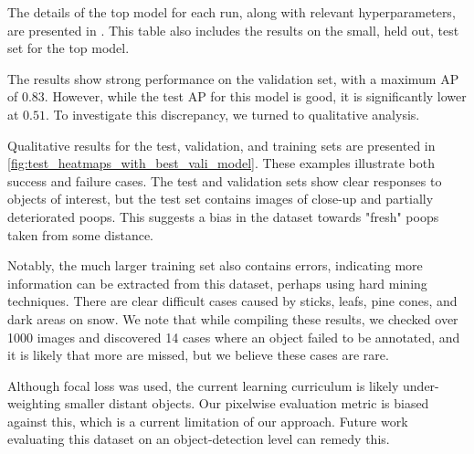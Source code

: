 \documentclass[10pt,twocolumn,letterpaper]{article}
\begin{document}

The details of the top model for each run, along with relevant hyperparameters, are presented in
  .
This table also includes the results on the small, held out, test set for the top model.

The results show strong performance on the validation set, with a maximum AP of $0.83$.
However, while the test AP for this model is good, it is significantly lower at $0.51$.
To investigate this discrepancy, we turned to qualitative analysis.

Qualitative results for the test, validation, and training sets are presented in
  \cref{fig:test_heatmaps_with_best_vali_model}.
These examples illustrate both success and failure cases.
The test and validation sets show clear responses to objects of interest, but the test set contains images
  of close-up and partially deteriorated poops.
This suggests a bias in the dataset towards "fresh" poops taken from some distance.

Notably, the much larger training set also contains errors, indicating more information can be extracted
  from this dataset, perhaps using hard mining techniques.
There are clear difficult cases caused by sticks, leafs, pine cones, and dark areas on snow.
We note that while compiling these results, we checked over 1000 images and discovered 14 cases where an
  object failed to be annotated, and it is likely that more are missed, but we believe these cases are rare.

Although focal loss was used, the current learning curriculum is likely under-weighting smaller distant
  objects.
Our pixelwise evaluation metric is biased against this, which is a current limitation of our approach.
Future work evaluating this dataset on an object-detection level can remedy this.



\end{document}
